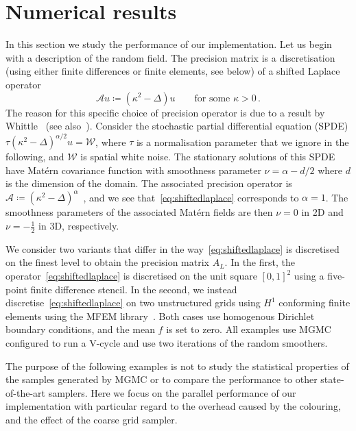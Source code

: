 \documentclass[
fontsize=11pt,
paper=a4,
numbers=noenddot
]{scrartcl}
\begin{document}
\section{Numerical results}\label{sec:numerics}
In this section we study the performance of our implementation. Let us begin with a description of the random field. The precision matrix is a discretisation (using either finite differences or finite elements, see below) of a shifted Laplace operator
\begin{equation}
    \label{eq:shiftedlaplace}
    \mathcal{A} u \coloneqq (\kappa^2 - \Delta) u \qquad \text{for some } \kappa > 0 \,.
\end{equation}
The reason for this specific choice of precision operator is due to a result by Whittle~\cite{whittle1954,whittle1963} (see also~\cite{lindgren,lindgrenSPDEApproachGaussian2022}). Consider the stochastic partial differential equation (SPDE) $\tau (\kappa^2 - \Delta)^{\alpha/2} u = \mathcal{W}$, where $\tau$ is a normalisation parameter that we ignore in the following, and $\mathcal{W}$ is spatial white noise. The stationary solutions of this SPDE have Mat\'ern covariance function with smoothness parameter $\nu = \alpha - d/2$ where $d$ is the dimension of the domain. The associated precision operator is $\mathcal{A} \coloneqq {(\kappa^2 - \Delta)}^\alpha$~\cite[Sec.\ 2.2]{lindgrenSPDEApproachGaussian2022}, and we see that~\eqref{eq:shiftedlaplace} corresponds to $\alpha = 1$. The smoothness parameters of the associated Mat\'ern fields are then $\nu = 0$ in 2D and $\nu = -\frac{1}{2}$ in 3D, respectively.

We consider two variants that differ in the way~\eqref{eq:shiftedlaplace} is discretised on the finest level to obtain the precision matrix $A_L$. In the first, the operator~\eqref{eq:shiftedlaplace} is discretised on the unit square ${[0,1]}^2$ using a five-point finite difference stencil. In the second, we instead discretise~\eqref{eq:shiftedlaplace} on two unstructured grids using $H^1$ conforming finite elements using the MFEM library~\cite{mfem,mfem-web}. Both cases use homogenous Dirichlet boundary conditions, and the mean $f$ is set to zero. All examples use MGMC configured to run a V-cycle and use two iterations of the random smoothers.

The purpose of the following examples is not to study the statistical properties of the samples generated by MGMC or to compare the performance to other state-of-the-art samplers. Here we focus on the parallel performance of our implementation with particular regard to the overhead caused by the colouring, and the effect of the coarse grid sampler.
\end{document}
